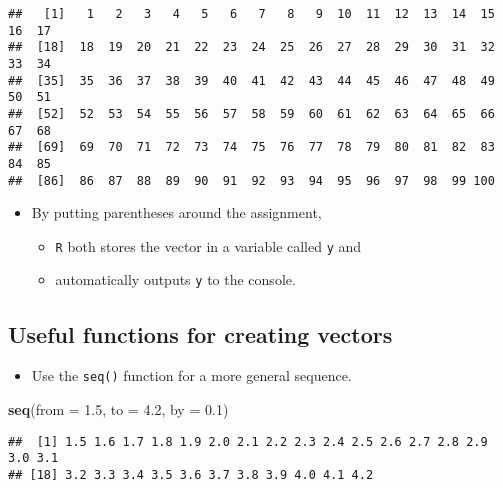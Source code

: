 \documentclass[]{book}
\newenvironment{Shaded}{\begin{snugshade}}{\end{snugshade}}
\newcommand{\DataTypeTok}[1]{\textcolor[rgb]{0.13,0.29,0.53}{#1}}
\newcommand{\FloatTok}[1]{\textcolor[rgb]{0.00,0.00,0.81}{#1}}
\newcommand{\KeywordTok}[1]{\textcolor[rgb]{0.13,0.29,0.53}{\textbf{#1}}}
\newcommand{\NormalTok}[1]{#1}
\providecommand{\tightlist}{%
  \setlength{\itemsep}{0pt}\setlength{\parskip}{0pt}}
\begin{document}
\begin{verbatim}
##   [1]   1   2   3   4   5   6   7   8   9  10  11  12  13  14  15  16  17
##  [18]  18  19  20  21  22  23  24  25  26  27  28  29  30  31  32  33  34
##  [35]  35  36  37  38  39  40  41  42  43  44  45  46  47  48  49  50  51
##  [52]  52  53  54  55  56  57  58  59  60  61  62  63  64  65  66  67  68
##  [69]  69  70  71  72  73  74  75  76  77  78  79  80  81  82  83  84  85
##  [86]  86  87  88  89  90  91  92  93  94  95  96  97  98  99 100
\end{verbatim}

\begin{itemize}
\tightlist
\item
  By putting parentheses around the assignment,

  \begin{itemize}
  \tightlist
  \item
    \texttt{R} both stores the vector in a variable called \texttt{y} and
  \item
    automatically outputs \texttt{y} to the console.
  \end{itemize}
\end{itemize}

\hypertarget{useful-functions-for-creating-vectors}{%
\subsection{Useful functions for creating vectors}\label{useful-functions-for-creating-vectors}}

\begin{itemize}
\tightlist
\item
  Use the \texttt{seq()} function for a more general sequence.
\end{itemize}

\begin{Shaded}
\begin{Highlighting}[]
\KeywordTok{seq}\NormalTok{(}\DataTypeTok{from =} \FloatTok{1.5}\NormalTok{, }\DataTypeTok{to =} \FloatTok{4.2}\NormalTok{, }\DataTypeTok{by =} \FloatTok{0.1}\NormalTok{)}
\end{Highlighting}
\end{Shaded}

\begin{verbatim}
##  [1] 1.5 1.6 1.7 1.8 1.9 2.0 2.1 2.2 2.3 2.4 2.5 2.6 2.7 2.8 2.9 3.0 3.1
## [18] 3.2 3.3 3.4 3.5 3.6 3.7 3.8 3.9 4.0 4.1 4.2
\end{verbatim}
\end{document}

